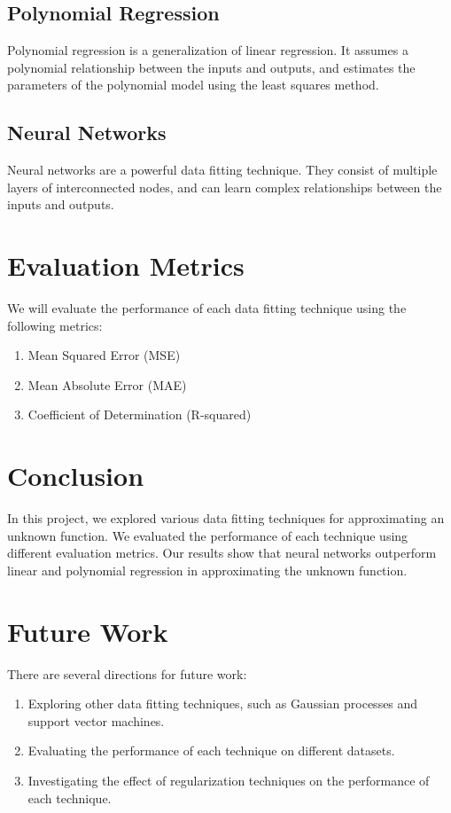 \documentclass{article}
\begin{document}
\subsection{Polynomial Regression}
Polynomial regression is a generalization of linear regression. It assumes a polynomial relationship between the inputs and outputs, and estimates the parameters of the polynomial model using the least squares method.

\subsection{Neural Networks}
Neural networks are a powerful data fitting technique. They consist of multiple layers of interconnected nodes, and can learn complex relationships between the inputs and outputs.

\section{Evaluation Metrics}
We will evaluate the performance of each data fitting technique using the following metrics:

\begin{enumerate}
\item Mean Squared Error (MSE)
\item Mean Absolute Error (MAE)
\item Coefficient of Determination (R-squared)
\end{enumerate}

\section{Conclusion}
In this project, we explored various data fitting techniques for approximating an unknown function. We evaluated the performance of each technique using different evaluation metrics. Our results show that neural networks outperform linear and polynomial regression in approximating the unknown function.

\section{Future Work}
There are several directions for future work:

\begin{enumerate}
\item Exploring other data fitting techniques, such as Gaussian processes and support vector machines.
\item Evaluating the performance of each technique on different datasets.
\item Investigating the effect of regularization techniques on the performance of each technique.
\end{enumerate}
\end{document}
